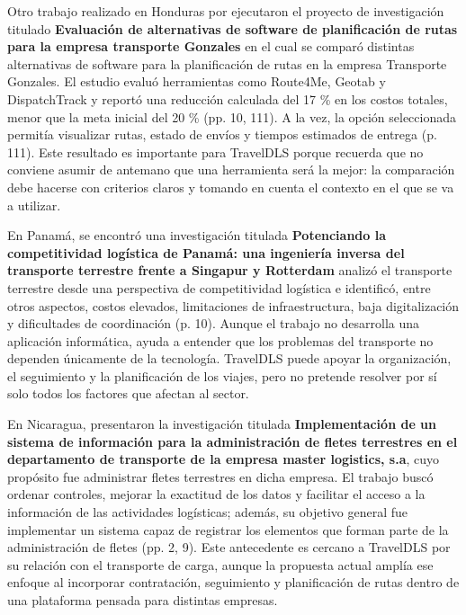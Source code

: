 \label{ant:hernandez}
Otro trabajo realizado en Honduras por \textcite{hernandez2024evaluacion} ejecutaron el proyecto de investigación titulado \textbf{Evaluación de alternativas de software de planificación de rutas para la empresa transporte Gonzales} en el cual se comparó distintas alternativas de software para la planificación de rutas en la empresa Transporte Gonzales. El estudio evaluó herramientas como Route4Me, Geotab y DispatchTrack y reportó una reducción calculada del 17 \% en los costos totales, menor que la meta inicial del 20 \% (pp. 10, 111). A la vez, la opción seleccionada permitía visualizar rutas, estado de envíos y tiempos estimados de entrega (p. 111). Este resultado es importante para TravelDLS porque recuerda que no conviene asumir de antemano que una herramienta será la mejor: la comparación debe hacerse con criterios claros y tomando en cuenta el contexto en el que se va a utilizar.

En Panamá, \textcite{castillo2025potenciando} se encontró una investigación titulada \textbf{Potenciando la competitividad logística de Panamá: una ingeniería inversa del transporte terrestre frente a Singapur y Rotterdam} analizó el transporte terrestre desde una perspectiva de competitividad logística e identificó, entre otros aspectos, costos elevados, limitaciones de infraestructura, baja digitalización y dificultades de coordinación (p. 10). Aunque el trabajo no desarrolla una aplicación informática, ayuda a entender que los problemas del transporte no dependen únicamente de la tecnología. TravelDLS puede apoyar la organización, el seguimiento y la planificación de los viajes, pero no pretende resolver por sí solo todos los factores que afectan al sector.

\label{ant:aragon}
En Nicaragua, \textcite{aragon2018implementacion} presentaron la investigación titulada \textbf{Implementación de un sistema de información para la administración de fletes terrestres en el departamento de transporte de la empresa master logistics, s.a}, cuyo propósito fue administrar fletes terrestres en dicha empresa. El trabajo buscó ordenar controles, mejorar la exactitud de los datos y facilitar el acceso a la información de las actividades logísticas; además, su objetivo general fue implementar un sistema capaz de registrar los elementos que forman parte de la administración de fletes (pp. 2, 9). Este antecedente es cercano a TravelDLS por su relación con el transporte de carga, aunque la propuesta actual amplía ese enfoque al incorporar contratación, seguimiento y planificación de rutas dentro de una plataforma pensada para distintas empresas.

